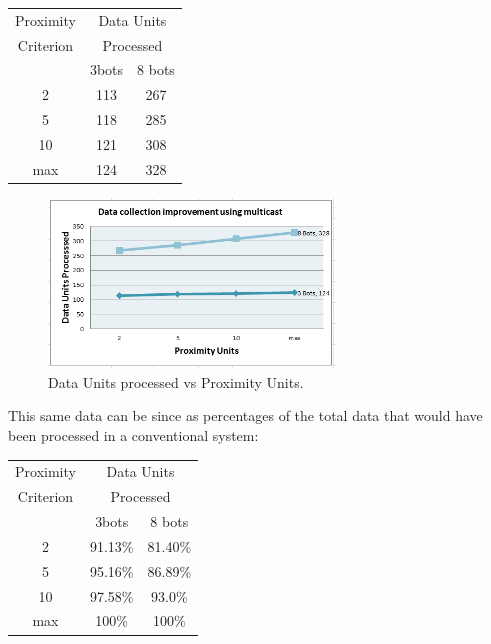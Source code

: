 \documentclass[journal]{IEEEtran}
\begin{document}
\begin{itemize}
\begin{center}
    \begin{tabular}{ | c | c | c |}
    \hline
    Proximity & \multicolumn{2}{|c|}{Data Units}  \\
    Criterion & \multicolumn{2}{|c|}{Processed}   \\  \cline{2-3} 
     & 3bots & 8 bots       \\ \hline \hline
    2 & 113 & 267	    \\
    5 & 118 & 285	    \\
    10 & 121 & 308	    \\
    max & 124 & 328	    \\
    \hline
    \end{tabular}
\end{center}

\begin{figure}[h!]
	\begin{center}
	\includegraphics[width=3in]{graph.png}
	\caption{Data Units processed vs Proximity Units.}
	\end{center}
\end{figure}

This same data can be since as percentages of the total data that would have been processed in a conventional system:

\begin{center}
    \begin{tabular}{ | c | c | c |}
    \hline
    Proximity & \multicolumn{2}{|c|}{Data Units} \\
    Criterion & \multicolumn{2}{|c|}{Processed} \\   \cline{2-3} 
     & 3bots & 8 bots        \\ \hline \hline
    2 & 91.13\% & 81.40\%    \\
    5 & 95.16\% & 86.89\%    \\
    10 & 97.58\% & 93.0\%    \\
    max & 100\% & 100\%	     \\
    \hline
    \end{tabular}
\end{center}


\end{itemize}
\end{document}
